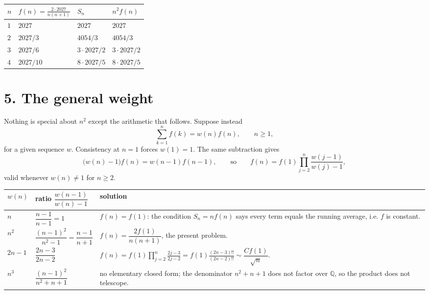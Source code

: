 \documentclass[12pt]{article}
\begin{document}
\begin{center}
\small
\renewcommand{\arraystretch}{1.3}
\begin{tabularx}{0.8\textwidth}{@{}lXXX@{}}
\toprule
\(n\) & \(f(n)=\frac{2\cdot2027}{n(n+1)}\) & \(S_n\) & \(n^2f(n)\) \\
\midrule
\(1\) & \(2027\)                & \(2027\)                  & \(2027\) \\
\(2\) & \(2027/3\)              & \(4054/3\)                & \(4054/3\) \\
\(3\) & \(2027/6\)              & \(3\cdot2027/2\)          & \(3\cdot2027/2\) \\
\(4\) & \(2027/10\)             & \(8\cdot2027/5\)          & \(8\cdot2027/5\) \\
\bottomrule
\end{tabularx}
\end{center}

\section*{5. The general weight}

Nothing is special about \(n^2\) except the arithmetic that follows.
Suppose instead
\[
\sum_{k=1}^{n}f(k)=w(n)f(n),\qquad n\ge1 ,
\]
for a given sequence \(w\). Consistency at \(n=1\) forces \(w(1)=1\).
The same subtraction gives
\[
\bigl(w(n)-1\bigr)f(n)=w(n-1)f(n-1),
\qquad\text{so}\qquad
f(n)=f(1)\prod_{j=2}^{n}\frac{w(j-1)}{w(j)-1},
\tag{6}
\]
valid whenever \(w(n)\ne1\) for \(n\ge2\).

\begin{center}
\small
\renewcommand{\arraystretch}{1.5}
\begin{tabularx}{\textwidth}{@{}>{\raggedright\arraybackslash}p{}>{\raggedright\arraybackslash}p{}X@{}}
\toprule
\(w(n)\) & ratio \(\dfrac{w(n-1)}{w(n)-1}\) & solution \\
\midrule
\(n\)
& \(\dfrac{n-1}{n-1}=1\)
& \(f(n)=f(1)\): the condition \(S_n=n f(n)\) says every term equals the
running average, i.e. \(f\) is constant. \\
\addlinespace
\(n^2\)
& \(\dfrac{(n-1)^2}{n^2-1}=\dfrac{n-1}{n+1}\)
& \(f(n)=\dfrac{2f(1)}{n(n+1)}\), the present problem. \\
\addlinespace
\(2n-1\)
& \(\dfrac{2n-3}{2n-2}\)
& \(f(n)=f(1)\displaystyle\prod_{j=2}^{n}\frac{2j-3}{2j-2}
=f(1)\frac{(2n-3)!!}{(2n-2)!!}\sim\dfrac{Cf(1)}{\sqrt n}\). \\
\addlinespace
\(n^3\)
& \(\dfrac{(n-1)^2}{n^2+n+1}\)
& no elementary closed form; the denominator \(n^2+n+1\) does not factor
over \(\mathbb Q\), so the product does not telescope. \\
\bottomrule
\end{tabularx}
\end{center}
\end{document}
